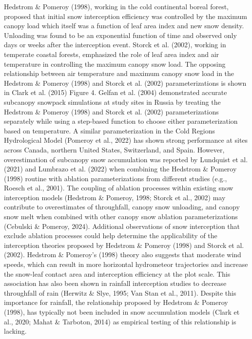 \documentclass[
  letterpaper,
  DIV=11,
  numbers=noendperiod]{scrartcl}
\begin{document}
Hedstrom \& Pomeroy (1998), working in the cold continental boreal
forest, proposed that initial snow interception efficiency was
controlled by the maximum canopy load which itself was a function of
leaf area index and new snow density. Unloading was found to be an
exponential function of time and observed only days or weeks after the
interception event. Storck et al. (2002), working in temperate coastal
forests, emphasized the role of leaf area index and air temperature in
controlling the maximum canopy snow load. The opposing relationship
between air temperature and maximum canopy snow load in the Hedstrom \&
Pomeroy (1998) and Storck et al. (2002) parameterizations is shown in
Clark et al. (2015) Figure 4. Gelfan et al. (2004) demonstrated accurate
subcanopy snowpack simulations at study sites in Russia by treating the
Hedstrom \& Pomeroy (1998) and Storck et al. (2002) parameterizations
separately while using a step-based function to choose either
parameterization based on temperature. A similar parameterization in the
Cold Regions Hydrological Model (Pomeroy et al., 2022) has shown strong
performance at sites across Canada, northern United States, Switzerland,
and Spain. However, overestimation of subcanopy snow accumulation was
reported by Lundquist et al. (2021) and Lumbrazo et al. (2022) when
combining the Hedstrom \& Pomeroy (1998) routine with ablation
parameterizations from different studies (e.g., Roesch et al., 2001).
The coupling of ablation processes within existing snow interception
models (Hedstrom \& Pomeroy, 1998; Storck et al., 2002) may contribute
to overestimates of throughfall, canopy snow unloading, and canopy snow
melt when combined with other canopy snow ablation parameterizations
(Cebulski \& Pomeroy, 2024). Additional observations of snow
interception that exclude ablation processes could help determine the
applicability of the interception theories proposed by Hedstrom \&
Pomeroy (1998) and Storck et al. (2002). Hedstrom \& Pomeroy's (1998)
theory also suggests that moderate wind speeds, which can result in more
horizontal hydrometeor trajectories and increase the snow-leaf contact
area and interception efficiency at the plot scale. This association has
also been shown in rainfall interception studies to decrease throughfall
of rain (Herwitz \& Slye, 1995; Van Stan et al., 2011). Despite this
importance for rainfall, the relationship proposed by Hedstrom \&
Pomeroy (1998), has typically not been included in snow accumulation
models (Clark et al., 2020; Mahat \& Tarboton, 2014) as empirical
testing of this relationship is lacking.
\end{document}
